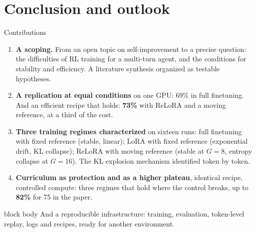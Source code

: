 \documentclass[aspectratio=169,10pt]{beamer}
\newcommand{\hl}[1]{\textcolor{crOrange}{\textbf{#1}}}
\newenvironment{keymsg}{\begin{beamercolorbox}[sep=6pt,wd=\textwidth]{block body}\small}{\end{beamercolorbox}}
\begin{document}
\section{Conclusion and outlook}

\begin{frame}{Contributions}
\begin{enumerate}
  \item \textbf{A scoping.} From an open topic on self-improvement to a precise question: the difficulties of RL training for a multi-turn agent, and the conditions for stability and efficiency. A literature synthesis organized as testable hypotheses.
  \item \textbf{A replication at equal conditions} on one GPU: 69\% in full finetuning. And an efficient recipe that holds: \hl{73\%} with ReLoRA and a moving reference, at a third of the cost.
  \item \textbf{Three training regimes characterized} on sixteen runs: full finetuning with fixed reference (stable, linear); LoRA with fixed reference (exponential drift, KL collapse); ReLoRA with moving reference (stable at $G=8$, entropy collapse at $G=16$). The KL explosion mechanism identified token by token.
  \item \textbf{Curriculum as protection and as a higher plateau}, identical recipe, controlled compute: three regimes that hold where the control breaks, up to \hl{82\%} for 75 in the paper.
\end{enumerate}
\vspace{0.15cm}
\begin{keymsg}
And a reproducible infrastructure: training, evaluation, token-level replay, logs and recipes, ready for another environment.
\end{keymsg}
\end{frame}
\end{document}
